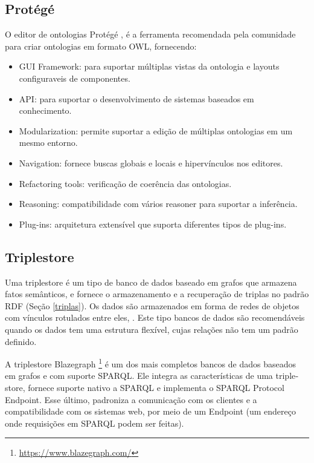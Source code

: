 \subsection*{Protégé}

O editor de ontologias Protégé \citep{musen2015protege}, é a ferramenta
recomendada pela comunidade para criar ontologias em formato \foreignlanguage{english}{OWL},
fornecendo:
%
\begin{itemize}
\item GUI Framework:\foreignlanguage{brazil}{ para suportar múltiplas vistas
da ontologia e layouts configuraveis de componentes.}
\item API:\foreignlanguage{brazil}{ para suportar o desenvolvimento de sistemas
baseados em conhecimento.}
\item Modularization\foreignlanguage{brazil}{: permite suportar a edição
de múltiplas ontologias em um mesmo entorno.}
\item Navigation\foreignlanguage{brazil}{: fornece buscas globais e locais
e hipervínculos nos editores.}
\item Refactoring tools\foreignlanguage{brazil}{: verificação de coerência
das ontologias.}
\item Reasoning:\foreignlanguage{brazil}{ compatibilidade com vários }reasoner\foreignlanguage{brazil}{
para suportar a inferência.}
\item Plug-ins\foreignlanguage{brazil}{: arquitetura extensível que suporta
diferentes tipos de }plug-ins.
\end{itemize}
%

%

\subsection*{Triplestore\label{subsec:Triplestore}}

%
Uma \foreignlanguage{english}{triplestore} é um tipo de banco de dados
baseado em grafos que armazena fatos semânticos, e fornece o armazenamento
e a recuperação de triplas no padrão \foreignlanguage{english}{RDF}
(Seção \ref{triplas}). Os dados são armazenados em forma de redes
de objetos com vínculos rotulados entre eles, \citep{rusher2003triple}.
Este tipo bancos de dados são recomendáveis quando os dados tem uma
estrutura flexível, cujas relações não tem um padrão definido.

A \foreignlanguage{english}{triplestore} \foreignlanguage{english}{Blazegraph}
\footnote{\url{https://www.blazegraph.com/}} é um dos mais completos
bancos de dados baseados em grafos e com suporte SPARQL. Ele integra
as características de uma \foreignlanguage{english}{triplestore},
fornece suporte nativo a \foreignlanguage{english}{SPARQL} e implementa
o \foreignlanguage{english}{SPARQL Protocol Endpoint}. Esse último,
padroniza a comunicação com os clientes e a compatibilidade com os
sistemas web, por meio de \foreignlanguage{english}{um Endpoint} (um
endereço onde requisições em SPARQL podem ser feitas). 

